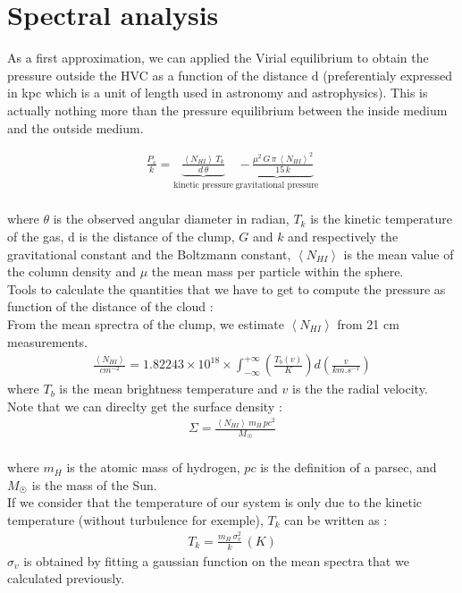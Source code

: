 \documentclass[a4paper,10.5pt]{report}
\begin{document}
\section{Spectral analysis}
As a first approximation, we can applied the Virial equilibrium to obtain the pressure outside the HVC as a function
of the distance d (preferentialy expressed in kpc which is a unit of length used in astronomy and astrophysics). 
This is actually nothing more than the pressure equilibrium between the inside medium and the outside medium.

\begin{align}
  \frac{P_s}{k} = \underbrace{\frac{\left< N_{HI} \right> \, T_k}{d \, \theta}}_\text{kinetic pressure} \,  
  \underbrace{- \, \frac{\mu^2 \, G \, \pi \, \left< N_{HI} \right>^2}{15 \, k}}_\text{gravitational pressure}
\end{align}  \\
where $\theta$ is the observed angular diameter in radian, $T_k$ is the kinetic temperature of the gas, d is the distance of the clump, 
$G$ and $k$ and respectively the gravitational constant and the Boltzmann constant, $\left< N_{HI} \right>$ is the mean value 
of the column density and $\mu$ the mean mass per particle within the sphere. \\

Tools to calculate the quantities that we have to get to compute the pressure as function of the distance of the cloud : \\

\noindent From the mean sprectra of the clump, we estimate $\left< N_{HI} \right>$ from 21 cm measurements. \\
\begin{align}
  \frac{\left< N_{HI} \right>}{cm^{-2}} = 1.82243 \times 10^{18} \times \int_{-\infty}^{+\infty} \left( \frac{T_b(v)}{K} \right) d\left( \frac{v}{km.s^{-1}}\right)
\end{align} 
where $T_b$ is the mean brightness temperature and $v$ is the the radial velocity. \\

\noindent Note that we can direclty get the surface density :
\begin{align}
  \Sigma = \frac{\left<N_{HI}\right> \, m_H \, pc^2}{M_\astrosun}
\end{align} \\
where $m_H$ is the atomic mass of hydrogen, $pc$ is the definition of a parsec,
and $M_{\astrosun}$ is the mass of the Sun. \\

If we consider that the temperature of our system is only due to the kinetic temperature (without turbulence for exemple), 
$T_k$ can be written as : 
\begin{align}
  T_k = \frac{m_H \, \sigma_v^2}{k} \, (K)
\end{align}
$\sigma_v$ is obtained by fitting a gaussian function on the mean spectra that we calculated previously.

\newpage
\end{document}
